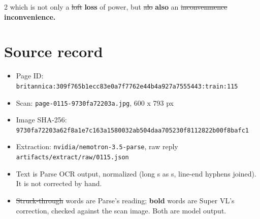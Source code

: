 \documentclass[10pt]{article}
\begin{document}
\begin{multicols}{2}
which is not only a \sout{loft} \textbf{loss} of power, but \sout{alo} \textbf{also} an \sout{inconvenmence} \textbf{inconvenience.}
\end{multicols}
\section*{Source record}
\begin{itemize}
\item Page ID: \texttt{britannica:309f765b1ecc83e0a7f7762e44b4a927a7555443:train:115}
\item Scan: \texttt{page-0115-9730fa72203a.jpg}, 600 x 793 px
\item Image SHA-256: \texttt{\small 9730fa72203a62f8a1e7c163a1580032ab504daa705230f8112822b00f8bafc1}
\item Extraction: \texttt{nvidia/nemotron-3.5-parse}, raw reply \texttt{artifacts/extract/raw/0115.json}
\item Text is Parse OCR output, normalized (long s as s, line-end hyphens joined). It is not corrected by hand.
\item \sout{Struck-through} words are Parse's reading; \textbf{bold} words are Super VL's correction, checked against the scan image. Both are model output.
\end{itemize}
\end{document}
